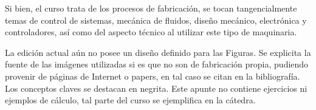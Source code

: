 \documentclass[12pt,letter,oneside]{book}
\numberwithin{equation}{chapter}
\numberwithin{figure}{chapter}
\numberwithin{table}{chapter}
\begin{document}
Si bien, el curso trata de los procesos de fabricación, se tocan tangencialmente temas de control de sistemas, mecánica de fluidos, diseño mecánico, electrónica y controladores, así como del aspecto técnico al utilizar este tipo de maquinaria.

La edición actual aún no posee un diseño definido para las Figuras. Se explicita la fuente de las imágenes utilizadas si es que no son de fabricación propia, pudiendo provenir de páginas de Internet o papers, en tal caso se citan en la bibliografía. Los conceptos claves se destacan en negrita. Este apunte no contiene ejercicios ni ejemplos de cálculo, tal parte del curso se ejemplifica en la cátedra.











\backmatter            %


\printbibliography
\end{document}
